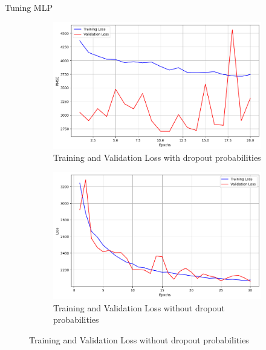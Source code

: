 \documentclass{beamer}
\begin{document}
    \begin{frame}{Tuning MLP}

    \begin{figure}[!h]
      \centering
      \begin{subfigure}{0.4\textwidth}
        \includegraphics[width=\linewidth]{Training and Validation Loss with dropout probabilities.png}
        \caption{Training and Validation Loss with dropout probabilities}
        \label{Training and Validation Loss with dropout probabilities}
      \end{subfigure}
      \medskip
      \begin{subfigure}{0.4\textwidth}
        \includegraphics[width=\linewidth]{Training and Validation Loss without dropout probabilities.png}
        \caption{Training and Validation Loss without dropout probabilities}
        \label{Training and Validation Loss without dropout probabilities}
      \end{subfigure}
    \end{figure}
    
    \end{frame}
\end{document}
